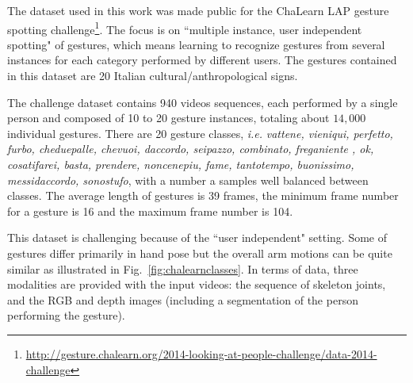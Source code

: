 
The dataset used in this work was made public for the ChaLearn LAP \cite{chalearnLAP} gesture spotting challenge\footnote{\href{http://gesture.chalearn.org/2014-looking-at-people-challenge/data-2014-challenge}{http://gesture.chalearn.org/2014-looking-at-people-challenge/data-2014-challenge}}.
%
The focus  is on ``multiple instance, user independent spotting" of gestures, which means learning to recognize gestures from several instances for each category performed by different users. The gestures contained in this dataset are 20 Italian cultural/anthropological signs.

The challenge dataset contains 940 videos sequences, each performed by a single person and composed of 10 to 20 gesture instances, totaling about $14,000$ individual gestures.
%
There are 20 gesture classes, \emph{i.e.} \emph{vattene, vieniqui, perfetto, furbo, cheduepalle, chevuoi, daccordo, seipazzo, combinato, freganiente
    , ok, cosatifarei, basta, prendere, noncenepiu, fame, tantotempo, buonissimo, messidaccordo, sonostufo}, with a number a samples well balanced between classes.
The average length of gestures is 39 frames, the minimum frame number for a gesture is 16  and the maximum frame number is 104.

This dataset is challenging because of the ``user independent" setting. Some of gestures differ primarily in hand pose but the overall arm motions can be quite similar as illustrated in Fig.~\ref{fig:chalearnclasses}.
In terms of data, three modalities are provided with the input videos: the sequence of skeleton joints, and the RGB and depth images
(including a segmentation of the person performing the gesture).

